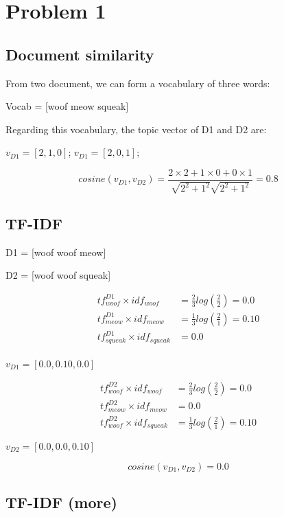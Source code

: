 \section{Problem 1}

\subsection{Document similarity}
From two document, we can form a vocabulary of three words:

Vocab = [woof \; meow \; squeak]

Regarding this vocabulary, the topic vector of D1 and D2 are:

$v_{D1}=[2, 1, 0]$; $v_{D1}=[2, 0, 1]$;

$$cosine(v_{D1}, v_{D2} )= \frac{2\times2 + 1\times 0 + 0 \times 1}{\sqrt{2^2 + 1^2} \sqrt{2^2 + 1^2}} = 0.8$$


\subsection{TF-IDF}

D1 = [woof woof meow] 

D2 = [woof woof squeak]


\begin{equation*}
\begin{aligned}
tf^{D1}_{woof} \times idf_{woof}&= \frac{2}{3}log(\frac{2}{2}) = 0.0\\
tf^{D1}_{meow} \times idf_{meow}&= \frac{1}{3}log(\frac{2}{1})= 0.10\\
tf^{D1}_{squeak} \times idf_{squeak}&= 0.0\\
\end{aligned}
\end{equation*}

$v_{D1}=[0.0, 0.10, 0.0]$


\begin{equation*}
\begin{aligned}
tf^{D2}_{woof} \times idf_{woof}&= \frac{2}{3}log(\frac{2}{2}) = 0.0\\
tf^{D2}_{meow} \times idf_{meow}&= 0.0\\
tf^{D2}_{woof} \times idf_{squeak}&= \frac{1}{3}log(\frac{2}{1}) = 0.10
\end{aligned}
\end{equation*}

$v_{D2}=[0.0, 0.0, 0.10]$

$$cosine(v_{D1}, v_{D2} )= 0.0$$


\subsection{TF-IDF (more)}

